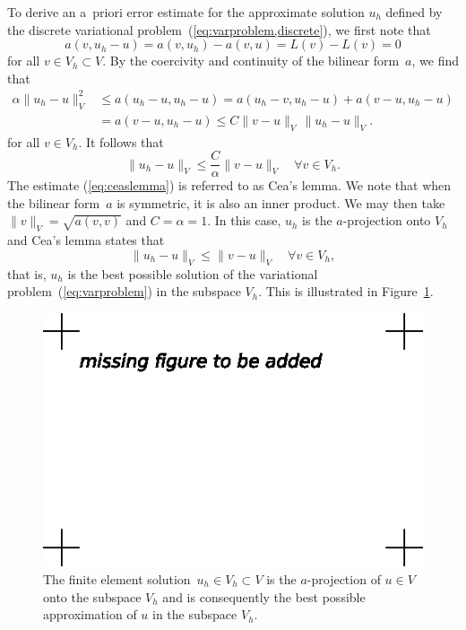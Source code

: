 To derive an a~priori error estimate for the approximate solution
$u_h$ defined by the discrete variational
problem~(\ref{eq:varproblem,discrete}), we first note that
\begin{displaymath}
  a(v, u_h - u) = a(v, u_h) - a(v, u) = L(v) - L(v) = 0
\end{displaymath}
for all $v \in V_h \subset V$. By the coercivity and continuity of the
bilinear form~$a$, we find that
\begin{displaymath}
  \begin{split}
    \alpha \|u_h - u\|_V^2
    &\leq a(u_h - u, u_h - u)
    = a(u_h - v, u_h - u) + a(v - u, u_h - u) \\
    &= a(v - u, u_h - u) \leq C \|v - u\|_V \, \|u_h - u\|_V.
  \end{split}
\end{displaymath}
for all $v \in V_h$. It follows that
\begin{equation} \label{eq:ceaslemma}
  \|u_h - u\|_V
  \leq \frac{C}{\alpha} \|v - u\|_V \quad \forall v \in V_h.
\end{equation}
The estimate (\ref{eq:ceaslemma}) is referred to as Cea's lemma. We
note that when the bilinear form~$a$ is symmetric, it is also an inner
product. We may then take $\|v\|_V = \sqrt{a(v, v)}$ and $C = \alpha =
1$. In this case, $u_h$ is the $a$-projection onto $V_h$ and Cea's
lemma states that
\begin{equation}
  \|u_h - u\|_V \leq \|v - u\|_V \quad \forall v \in V_h,
\end{equation}
that is, $u_h$ is the best possible solution of the variational
problem~(\ref{eq:varproblem}) in the subspace $V_h$. This is
illustrated in Figure~\ref{fig:ceaslemma}.

\begin{figure}
  \begin{center}
    \includegraphics[width=\largewidth]{chapters/kirby-7/eps/missing-figure.eps}
    \caption{The finite element solution~$u_h \in V_h \subset V$ is
      the $a$-projection of $u \in V$ onto the subspace $V_h$ and is
      consequently the best possible approximation of $u$ in the
      subspace $V_h$.}
    \label{fig:ceaslemma}
  \end{center}
\end{figure}

